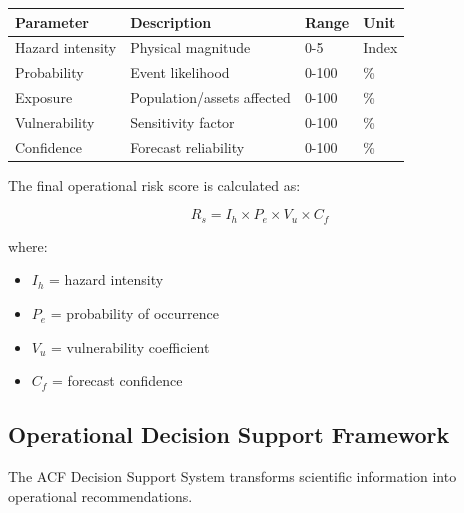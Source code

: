 \begin{center}

\begin{tabular}{llll}

\toprule

Parameter & Description & Range & Unit \\

\midrule

Hazard intensity & Physical magnitude & 0-5 & Index \\

Probability & Event likelihood & 0-100 & \% \\

Exposure & Population/assets affected & 0-100 & \% \\

Vulnerability & Sensitivity factor & 0-100 & \% \\

Confidence & Forecast reliability & 0-100 & \% \\

\bottomrule

\end{tabular}

\end{center}


The final operational risk score is calculated as:

\[
R_s =
I_h
\times
P_e
\times
V_u
\times
C_f
\]

where:

\begin{itemize}

\item $I_h$ = hazard intensity

\item $P_e$ = probability of occurrence

\item $V_u$ = vulnerability coefficient

\item $C_f$ = forecast confidence

\end{itemize}


\subsection{Operational Decision Support Framework}

The ACF Decision Support System transforms scientific information
into operational recommendations.


